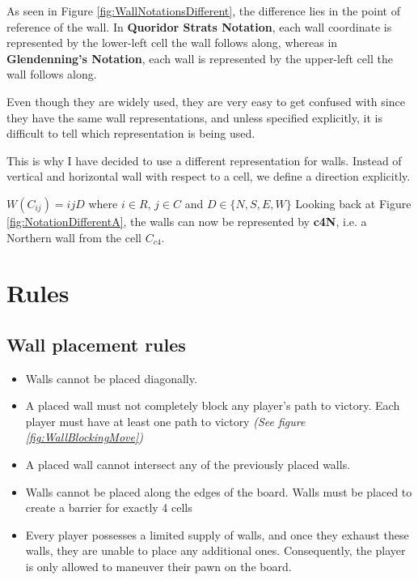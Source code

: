 As seen in Figure \ref{fig:WallNotationsDifferent}, the difference lies in the point of reference of the wall.
In \textbf{Quoridor Strats Notation}, each wall coordinate is represented by the lower-left cell the wall
follows along, whereas in \textbf{Glendenning's Notation}, each wall is represented by the upper-left cell the
wall follows along.


Even though they are widely used, they are very easy to get confused with since they have the same wall representations,
and unless specified explicitly, it is difficult to tell which representation is being used.
\par
This is why I have decided to use a different representation for walls. Instead of vertical and horizontal wall
with respect to a cell, we define a direction explicitly.
\par
$W(C_{ij}) = ijD$ where $i \in R$, $j \in C$ and $D \in \{N, S, E, W\}$
\newline
Looking back at Figure \ref{fig:NotationDifferentA}, the walls can now be represented by \textbf{c4N}, i.e. a
Northern wall from the cell $C_{c4}$.

\pagebreak

\section {Rules}

\subsection{Wall placement rules}
\label{WallRules}

\begin{itemize}
    \item Walls cannot be placed diagonally.
    \item A placed wall must not completely block any player's path to victory. Each player must have at least
        one path to victory \textit{(See figure \ref{fig:WallBlockingMove})}
    \item A placed wall cannot intersect any of the previously placed walls.
    \item Walls cannot be placed along the edges of the board. Walls must be placed to create a barrier for
        exactly 4 cells
    \item  Every player possesses a limited supply of walls, and once they exhaust these walls, they are unable
        to place any additional ones. Consequently, the player is only allowed to maneuver their pawn on the
        board.
\end{itemize}

